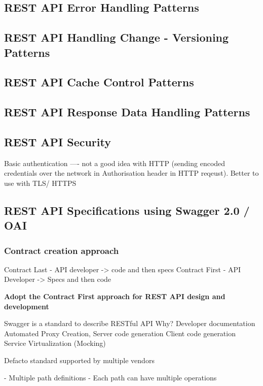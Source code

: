 \subsection{REST API Error Handling Patterns}

\subsection{REST API Handling Change - Versioning Patterns}

\subsection{REST API Cache Control Patterns}

\subsection{REST API Response Data Handling Patterns}

\subsection{REST API Security}

Basic authentication ---- not a good idea with HTTP (sending encoded credentials over the network in Authorisation header in HTTP reqeust).
Better to use with TLS/ HTTPS

\subsection{REST API Specifications using Swagger 2.0 / OAI}

\subsubsection{Contract creation approach}
Contract Last - API developer -> code and then specs
Contract First - API Developer -> Specs and then code

\textbf{Adopt the Contract First approach for REST API design and development}

Swagger is a standard to describe RESTful API
Why?
Developer documentation
Automated Proxy Creation, Server code generation
Client code generation
Service Virtualization (Mocking)

Defacto standard supported by multiple vendors

- Multiple path definitions
- Each path can have multiple operations

